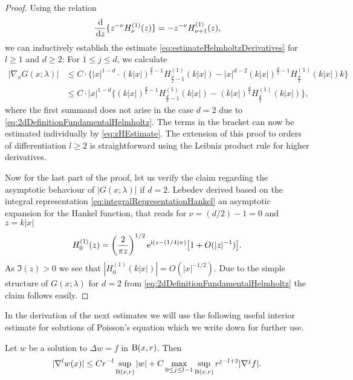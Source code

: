 \begin{proof}
  Using the relation
  \begin{align*}
    \frac{\, {\operatorname{d}\!{}}}{\, {\operatorname{d}\!{z}}} \{ z^{-\nu} H_\nu^{(1)}(z) \} = -z^{-\nu} H_{\nu + 1}^{(1)} (z),
  \end{align*}
  we can inductively establish the estimate \eqref{eq:estimateHelmholtzDerivatives} for $l \geq 1$ and $d \geq 2$:
  For $1 \leq j \leq d$, we calculate
  \begin{align*}
    |\nabla_x^{} G(x; \lambda)|
    &\leq C  \cdot \big\{|x|^{1 - d} \cdot (k|x|)^{\frac{d}{2} - 1} H_{\frac{d}{2} - 1}^{(1)}(k|x|) - |x|^{d - 2} (k|x|)^{\frac{d}{2} - 1} H_{\frac{d}{2}}^{(1)}(k|x|) k\big\} \\
    &\leq C \cdot |x|^{1 - d}\big\{(k|x|)^{\frac{d}{2} - 1} H_{\frac{d}{2} - 1}^{(1)}(k|x|) -  (k|x|)^{\frac{d}{2}} H_{\frac{d}{2}}^{(1)}(k|x|) \big\},
  \end{align*}
  where the first summand does not arise in the case $d = 2$ due to \eqref{eq:2dDefinitionFundamentalHelmholtz}.
  The terms in the bracket can now be estimated individually by \eqref{eq:zHEstimate}.
  The extension of this proof to orders of differentiation $l \geq 2$ is straightforward using the Leibniz product rule for higher derivatives.

  Now for the last part of the proof, let us verify the claim regarding the asymptotic behaviour of $|G(x; \lambda)|$ if $d = 2$.
  Lebedev \cite[Sec. 5.11, Eq.  (5.11.3)]{lebedev} derived based on the integral representation \eqref{eq:integralRepresentationHankel} an asymptotic expansion for the Hankel function, that reads for $\nu = (d/2) - 1 = 0$ and $z = k|x|$   
  \begin{align*}
    H_0^{(1)}(z) = \left(\frac{2}{\pi z}\right)^{1/2} \mathrm{e}^{\mathrm{i} (z - (1/4) \pi)} \big[ 1 + O(|z|^{-1})\big].
  \end{align*}
  As $\Im(z) > 0$ we see that $|H_0^{(1)}(k |x|)| = O(|x|^{-1/2})$.
  Due to the simple structure of $G(x; \lambda)$ for $d = 2$ from \eqref{eq:2dDefinitionFundamentalHelmholtz} the claim follows easily.
\end{proof}

In the derivation of the next estimates we will use the following useful interior estimate for solutions of Poisson's equation which we write down for further use.

\begin{lem}
  \label{lem:interiorEstimatePoisson}
  Let $w$ be a solution to $\Delta w = f$ in $\mathrm{B}(x,r)$. Then
  \begin{align}
    \label{eq:interiorEstimatePoisson}
    |\nabla^l w(x)| \leq C r^{-l} \sup_{\mathrm{B}(x,r)} |w| + C \max_{0 \leq j \leq l - 1} \sup_{\mathrm{B}(x,r)} r^{j - l + 2} |\nabla^j f|.
  \end{align}
\end{lem}

